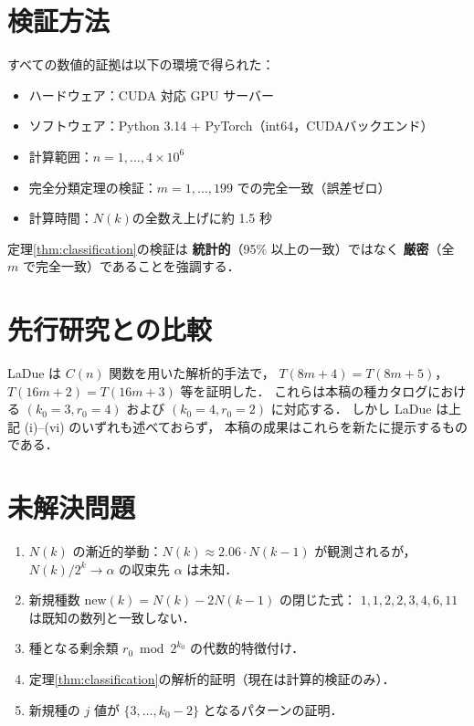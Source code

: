 \documentclass[twocolumn,a4paper,10pt]{jsarticle}
\begin{document}
\section{検証方法}

すべての数値的証拠は以下の環境で得られた：
\begin{itemize}
  \item ハードウェア：CUDA 対応 GPU サーバー
  \item ソフトウェア：Python 3.14 + PyTorch（int64，CUDAバックエンド）
  \item 計算範囲：$n = 1, \ldots, 4 \times 10^6$
  \item 完全分類定理の検証：$m = 1, \ldots, 199$ での完全一致（誤差ゼロ）
  \item 計算時間：$N(k)$の全数え上げに約 1.5 秒
\end{itemize}

定理\ref{thm:classification}の検証は
\textbf{統計的}（95\% 以上の一致）ではなく
\textbf{厳密}（全 $m$ で完全一致）であることを強調する．

\section{先行研究との比較}

LaDue \cite{ladue2017} は $C(n)$ 関数を用いた解析的手法で，
$T(8m+4)=T(8m+5)$，$T(16m+2)=T(16m+3)$ 等を証明した．
これらは本稿の種カタログにおける
$(k_0=3, r_0=4)$ および $(k_0=4, r_0=2)$ に対応する．
しかし LaDue \cite{ladue2017} は上記 (i)--(vi) のいずれも述べておらず，
本稿の成果はこれらを新たに提示するものである．

\section{未解決問題}

\begin{enumerate}\itemsep0pt
  \item $N(k)$ の漸近的挙動：$N(k) \approx 2.06\cdot N(k-1)$ が観測されるが，
        $N(k)/2^k \to \alpha$ の収束先 $\alpha$ は未知．
  \item 新規種数 $\mathrm{new}(k) = N(k) - 2N(k-1)$ の閉じた式：
        $1,1,2,2,3,4,6,11$ は既知の数列と一致しない．
  \item 種となる剰余類 $r_0 \bmod 2^{k_0}$ の代数的特徴付け．
  \item 定理\ref{thm:classification}の解析的証明（現在は計算的検証のみ）．
  \item 新規種の $j$ 値が $\{3,\ldots,k_0-2\}$ となるパターンの証明．
\end{enumerate}
\end{document}
